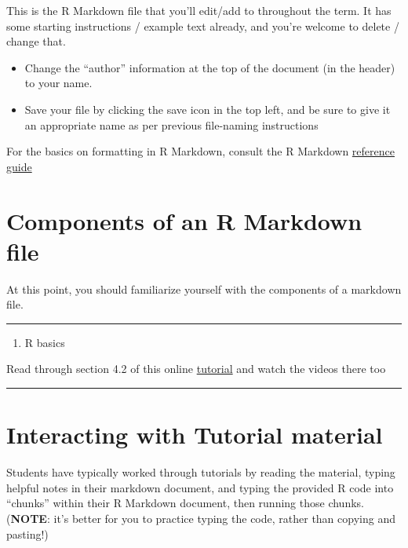 \documentclass[
]{book}
\providecommand{\tightlist}{%
  \setlength{\itemsep}{0pt}\setlength{\parskip}{0pt}}
\begin{document}
This is the R Markdown file that you'll edit/add to throughout the term. It has some starting instructions / example text already, and you're welcome to delete / change that.

\begin{itemize}
\tightlist
\item
  Change the ``author'' information at the top of the document (in the header) to your name.
\item
  Save your file by clicking the save icon in the top left, and be sure to give it an appropriate name as per previous file-naming instructions
\end{itemize}

For the basics on formatting in R Markdown, consult the R Markdown \href{https://www.rstudio.com/wp-content/uploads/2015/03/rmarkdown-reference.pdf}{reference guide}

\section{Components of an R Markdown file}\label{md_components}

At this point, you should familiarize yourself with the components of a markdown file.

\begin{center}\rule{0.5\linewidth}{0.5pt}\end{center}

\begin{enumerate}
\def\labelenumi{\arabic{enumi}.}
\tightlist
\item
  R basics
\end{enumerate}

Read through section 4.2 of this online \href{https://rbasics.netlify.app/4-rmarkdown.html\#the-components-of-an-r-markdown-file}{tutorial} and watch the videos there too

\begin{center}\rule{0.5\linewidth}{0.5pt}\end{center}

\section{Interacting with Tutorial material}\label{interact_tutorial}

Students have typically worked through tutorials by reading the material, typing helpful notes in their markdown document, and typing the provided R code into ``chunks'' within their R Markdown document, then running those chunks. (\textbf{NOTE}: it's better for you to practice typing the code, rather than copying and pasting!)
\end{document}
